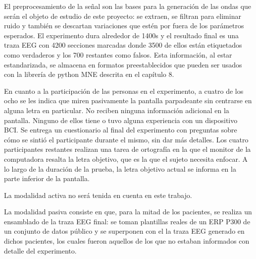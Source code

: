 \documentclass[../00_Main.tex]{subfiles}
\begin{document}
El preprocesamiento de la señal son las bases para la generación de las ondas que serán el objeto de estudio de este proyecto: se extraen, se filtran para eliminar ruido y también se descartan variaciones que estén por fuera de los parámetros esperados. El experimento dura alrededor de 1400s y el resultado final es una traza EEG con 4200 secciones marcadas donde 3500 de ellos están etiquetados como verdaderos y los 700 restantes como falsos. Esta información, al estar estandarizada, se almacena en formatos preestablecidos que pueden ser usados con la librería de python MNE descrita en el capítulo 8.

En cuanto a la participación de las personas en el experimento, a cuatro de los ocho se les indica que miren pasivamente la pantalla parpadeante sin centrarse en alguna letra en particular. No reciben ninguna información adicional en la pantalla. Ninguno de ellos tiene o tuvo alguna experiencia con un dispositivo BCI.  Se entrega un cuestionario al final del experimento con preguntas sobre cómo se sintió el participante durante el mismo, sin dar más detalles. Los cuatro participantes restantes realizan una tarea de ortografía en la que el monitor de la computadora resalta la letra objetivo, que es la que el sujeto necesita enfocar. A lo largo de la duración de la prueba, la letra objetivo actual se informa en la parte inferior de la pantalla.

La modalidad activa no será tenida en cuenta en este trabajo. 

La modalidad pasiva consiste en que, para la mitad de los pacientes, se realiza un ensamblado de la traza EEG final: se toman plantillas reales de un ERP P300 de un conjunto de datos público y se superponen con el la traza EEG generado en dichos pacientes, los cuales fueron aquellos de los que no estaban informados con detalle del experimento.

\biblio %
\end{document}
